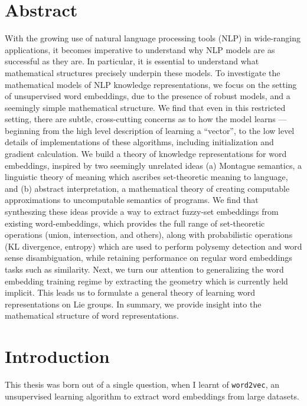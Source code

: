 \documentclass[11pt]{book}
\begin{document}
\chapter*{Abstract}
\label{ch:abstract}
With the growing use of natural language processing tools (NLP) in wide-ranging applications, it becomes imperative to understand why NLP models are as successful as they are. In particular, it is essential to understand what mathematical structures precisely underpin these models. To investigate the mathematical models of NLP knowledge representations, we focus on the setting of unsupervised word embeddings, due to the presence of robust models, and a seemingly simple mathematical structure. We find that even in this restricted setting, there are subtle, cross-cutting concerns as to how the model learns --- beginning from the high level description of learning a ``vector'', to the low level details of implementations of these algorithms, including initialization and gradient calculation. We build a theory of knowledge representations for word embeddings, inspired by two seemingly unrelated ideas (a) Montague semantics, a linguistic theory of meaning which ascribes set-theoretic meaning to language, and (b) abstract interpretation, a  mathematical theory of creating computable approximations to uncomputable semantics of programs. We find that syntheszing these ideas provide a way to extract fuzzy-set embeddings from existing word-embeddings, which provides the full range of set-theoretic operations (union, intersection, and others), along with probabilistic operations (KL divergence, entropy) which are used to perform polysemy detection and word sense disambiguation, while retaining performance on regular word embeddings tasks such as similarity. Next, we turn our attention to generalizing the word embedding training regime by extracting the geometry which is currently held implicit. This leads us to formulate a general theory of learning word representations on Lie groups. In summary, we provide insight into the mathematical structure of word representations. 



\tableofcontents
\listoffigures
\listoftables

\chapter{Introduction}

This thesis was born out of a single question, when I learnt of \texttt{word2vec}, an unsupervised learning algorithm to extract word embeddings from large datasets.
\end{document}
